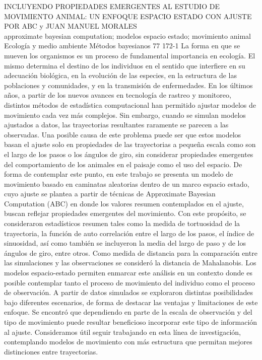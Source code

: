 \A
{INCLUYENDO PROPIEDADES EMERGENTES AL ESTUDIO DE MOVIMIENTO ANIMAL: UN ENFOQUE ESPACIO ESTADO CON AJUSTE POR ABC}
{ y JUAN MANUEL MORALES}
{
\\}
{approximate bayesian computation; modelos espacio estado; movimiento animal} 
 {Ecología y medio ambiente} 
 {Métodos bayesianos} 
 {77} 
 {172-1}
{La forma en que se mueven los organismos es un proceso de fundamental importancia en ecología. El mismo determina el destino de los individuos en el sentido que interfiere en su adecuación biológica, en la evolución de las especies, en la estructura de las poblaciones y comunidades, y en la transmisión de enfermedades. En los últimos años, a partir de los nuevos avances en tecnología de rastreo y monitoreo, distintos métodos de estadística computacional han permitido ajustar modelos de movimiento cada vez más complejos. Sin embargo, cuando se simulan modelos ajustados a datos, las trayectorias resultantes raramente se parecen a las observadas. Una posible causa de este problema puede ser que estos modelos basan el ajuste solo en propiedades de las trayectorias a pequeña escala como son el largo de los pasos o los ángulos de giro, sin considerar propiedades emergentes del comportamiento de los animales en el paisaje como el uso del espacio. De forma de contemplar este punto, en este trabajo se presenta un modelo de movimiento basado en caminatas aleatorias dentro de un marco espacio estado, cuyo ajuste se plantea a partir de técnicas de Approximate Bayesian Computation (ABC) en donde los valores resumen contemplados en el ajuste, buscan reflejar propiedades emergentes del movimiento. Con este propósito, se consideraron estadísticos resumen tales como la medida de tortuosidad de la trayectoria, la función de auto correlación entre el largo de los pasos, el índice de sinuosidad, así como también se incluyeron la media del largo de paso y de los ángulos de giro, entre otros. Como medida de distancia para la comparación entre las simulaciones y las observaciones se consideró la distancia de Mahalanobis. Los modelos espacio-estado permiten enmarcar este análisis en un contexto donde es posible contemplar tanto el proceso de movimiento del individuo como el proceso de observación. A partir de datos simulados se exploraron distintas posibilidades bajo diferentes escenarios, de forma de destacar las ventajas y limitaciones de este enfoque. Se encontró que dependiendo en parte de la escala de observación y del tipo de movimiento puede resultar beneficioso incorporar este tipo de información al ajuste. Consideramos útil seguir trabajando en esta línea de investigación, contemplando modelos de movimiento con más estructura que permitan mejores distinciones entre trayectorias. }
